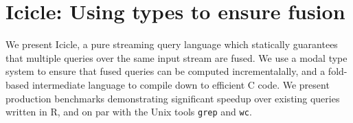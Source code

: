 \part{Icicle: Using types to ensure fusion}
\label{part:icicle}



We present Icicle, a pure streaming query language which statically guarantees that multiple queries over the same input stream are fused. We use a modal type system to ensure that fused queries can be computed incrementalally, and a fold-based intermediate language to compile down to efficient C code. We present production benchmarks demonstrating significant speedup over existing queries written in R, and on par with the Unix tools \texttt{grep} and \texttt{wc}.







